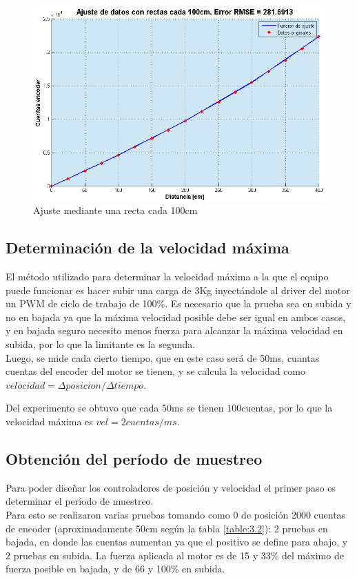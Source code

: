 \begin{figure}[!ht]
	\centering
	\includegraphics[width=15cm,scale=1]{resources/3_13-ajusteRectas100cm.png}
	\caption{Ajuste mediante una recta cada 100cm}
	\label{fig:\thefigure}
\end{figure}


\subsection{Determinación de la velocidad máxima}
El método utilizado para determinar la velocidad máxima a la que el equipo puede funcionar es hacer subir una carga de 3Kg inyectándole al driver del  motor un PWM de ciclo de trabajo de 100\%. Es necesario que la prueba sea en subida y no en bajada ya que la máxima velocidad posible debe ser igual en ambos casos, y en bajada seguro necesito menos fuerza para alcanzar la máxima velocidad en subida, por lo que la limitante es la segunda. \\
Luego, se mide cada cierto tiempo, que en este caso será de 50ms, cuantas cuentas del encoder del motor se tienen, y se calcula la velocidad como \(velocidad = \Delta posicion/\Delta tiempo \).

Del experimento se obtuvo que cada 50ms se tienen 100cuentas, por lo que la velocidad máxima es \(vel = 2cuentas/ms\).

\subsection{Obtención del período de muestreo}
Para poder diseñar los controladores de posición y velocidad el primer paso es determinar el período de muestreo. \\
Para esto se realizaron varias pruebas tomando como 0 de posición 2000 cuentas de encoder (aproximadamente 50cm según la tabla \ref{table:3.2}): 2 pruebas en bajada, en donde las cuentas aumentan ya que el positivo se define para abajo, y 2 pruebas en subida. La fuerza aplicada al motor es de 15 y 33\% del máximo de fuerza posible en bajada, y de 66 y 100\% en subida.




